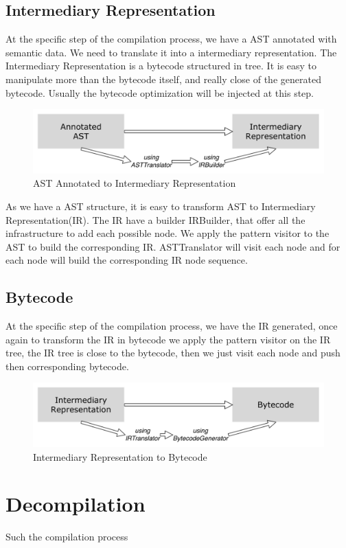 \documentclass[a4paper,10pt,twoside]{book}
\begin{document}
\subsection{Intermediary Representation}
At the specific step of the compilation process, we have a AST annotated with semantic data. We need to translate it into a intermediary representation. The Intermediary Representation is a bytecode structured in tree. It is easy to manipulate more than the bytecode itself, and really close of the generated bytecode. Usually the bytecode optimization will be injected at this step.
 
\begin{figure}[ht]\centering
	\includegraphics[width=\linewidth]{AnnotatedASTToIR}
	\caption{AST Annotated to Intermediary Representation }
\end{figure}

As we have a AST structure, it is easy to transform AST to Intermediary Representation(IR). The IR have a builder IRBuilder, that offer all the infrastructure to add each possible node. We apply the pattern visitor to the AST to build the corresponding IR. ASTTranslator will visit each node and for each node will build the corresponding IR node sequence.


\subsection{Bytecode}
At the specific step of the compilation process, we have the IR generated, once again to transform the IR in bytecode we apply the pattern visitor on the IR tree, the IR tree is close to the bytecode, then we just visit each node and push then corresponding bytecode.

\begin{figure}[ht]\centering
	\includegraphics[width=\linewidth]{IRToBytecode}
	\caption{Intermediary Representation to Bytecode }
\end{figure}

\section{Decompilation}
Such the compilation process

\ifx\wholebook\relax\else
   
   
\end{document}
